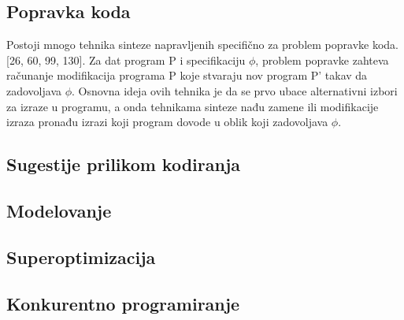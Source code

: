 \subsection{Popravka koda}
\label{subsec:PopravkaKoda}

Postoji mnogo tehnika sinteze napravljenih specifično za problem popravke koda. [26, 60, 99, 130]. Za dat program P i specifikaciju $\phi$, problem popravke zahteva računanje modifikacija programa P koje stvaraju nov program P’ takav da zadovoljava $\phi$. Osnovna ideja ovih tehnika je da se prvo ubace alternativni izbori za izraze u programu, a onda tehnikama sinteze nađu zamene ili modifikacije izraza pronađu izrazi koji program dovode u oblik koji zadovoljava $\phi$.


\subsection{Sugestije prilikom kodiranja}
\label{subsec:SugestijePrilikomKodiranja}


\subsection{Modelovanje}
\label{subsec:Modelovanje}

\subsection{Superoptimizacija}
\label{subsec:Superoptimizacija}

\subsection{Konkurentno programiranje}
\label{subsec:KonkurentnoProgramiranje}
